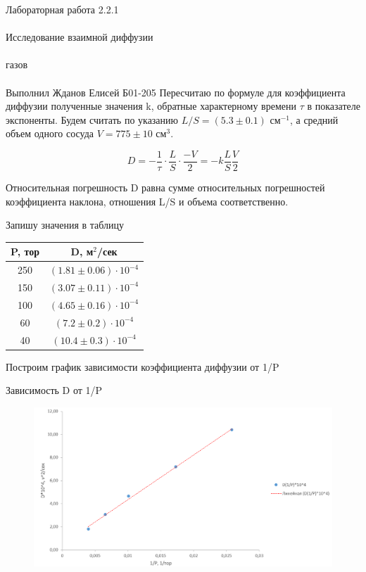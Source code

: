 \documentclass{astroedu-lab}
\begin{document}
\begin{problem}{\huge Лабораторная работа 2.2.1\\\\Исследование взаимной диффузии\\\\газов\\\\Выполнил Жданов Елисей Б01-205}
Пересчитаю по формуле для коэффициента диффузии полученные значения k, обратные характерному времени $\tau$ в показателе экспоненты. Будем считать по указанию $L/S = (5.3 \pm 0.1)$ см$^{-1}$, а средний объем одного сосуда $V = 775 \pm 10$ см$^{3}$.

\begin{equation}
	D = -\frac{1}{\tau} \cdot \frac{L}{S} \cdot \frac{-V}{2} = -k \frac{L}{S} \frac{V}{2}
\end{equation}

Относительная погрешность D равна сумме относительных погрешностей коэффициента наклона, отношения L/S и объема соответственно.

Запишу значения в таблицу

\begin{center}
\begin{tabular}{|c|c|}
\hline 
P, тор & D, м$^{2}$/сек \\
\hline
250 & $(1.81 \pm 0.06) \cdot 10^{-4}$ \\
150 & $(3.07 \pm 0.11) \cdot 10^{-4}$ \\
100 & $(4.65 \pm 0.16) \cdot 10^{-4}$ \\
60 & $(7.2 \pm 0.2) \cdot 10^{-4}$ \\
40 & $(10.4 \pm 0.3) \cdot 10^{-4}$ \\
\hline
\end{tabular}
\end{center}

Построим график зависимости коэффициента диффузии от 1/P

\newpage

\begin{center}
	\Large Зависимость D от 1/P
\end{center}

\begin{figure}[!h]
	\centering
	\includegraphics[width=1\textwidth]{лол.png}
	\label{fig:boiler}
\end{figure}


\end{problem}
\end{document}
